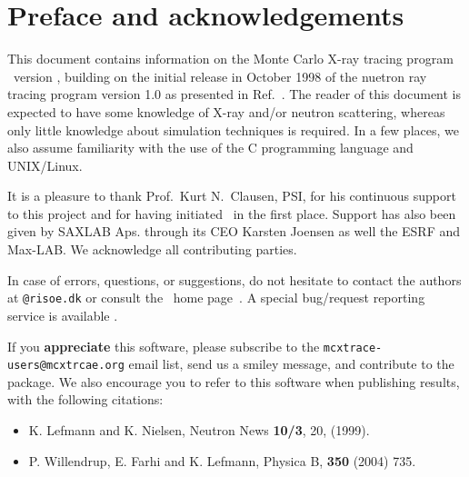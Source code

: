 
\chapter*{Preface and acknowledgements}
This document contains information on the Monte Carlo
X-ray tracing program \MCX\ version \version, building on the initial
release in October 1998 of the nuetron ray tracing program \MCS version 1.0 as presented in Ref.~\cite{nn_10_20}. The reader of this
document is expected to have some knowledge of X-ray and/or neutron scattering,
whereas only little knowledge about simulation techniques is
required. In a few places, we also assume familiarity with the
use of the C programming language and UNIX/Linux.

It is a pleasure to thank Prof.~Kurt N.~Clausen, PSI, for his continuous
support to this project and for having initiated \MCS\ in the first
place. 
Support has also been given by SAXLAB Aps. through its CEO Karsten Joensen as well 
the ESRF and Max-LAB. We acknowledge all contributing parties. 


In case of errors, questions, or suggestions,
do not hesitate to
contact the authors at \verb+@risoe.dk+
or consult the \MCX\ home page~\cite{mcxtrace_webpage}.
A special bug/request reporting service is available \cite{mczilla_webpage}.

If you {\bf appreciate} this software, please subscribe to the \verb+mcxtrace-users@mcxtrcae.org+ email list, send us a smiley message, and contribute to the package. We also encourage you to refer to this software when publishing results, with the following citations:
\begin{itemize}
\item{K. Lefmann and K. Nielsen, Neutron News {\bf 10/3}, 20, (1999).}
\item{P. Willendrup, E. Farhi and K. Lefmann, Physica B, {\bf 350} (2004) 735.}
\end{itemize}



